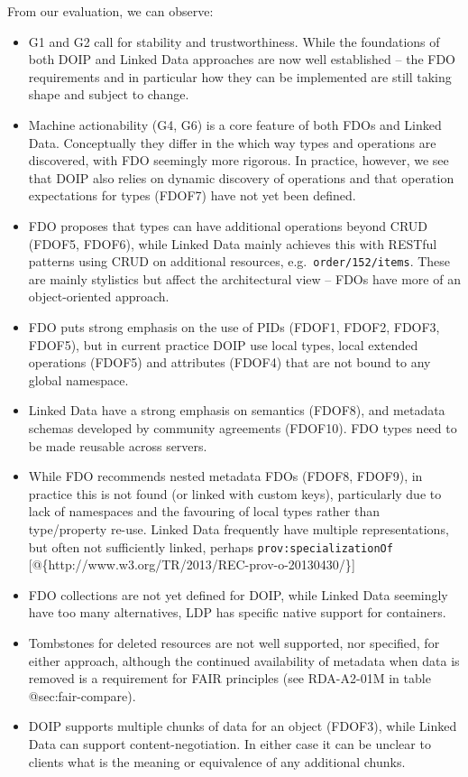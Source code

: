 From our evaluation, we can observe:

\begin{itemize}
\tightlist
\item
  G1 and G2 call for stability and trustworthiness. While the
  foundations of both DOIP and Linked Data approaches are now well
  established -- the FDO requirements and in particular how they can be
  implemented are still taking shape and subject to change.
\item
  Machine actionability (G4, G6) is a core feature of both FDOs and
  Linked Data. Conceptually they differ in the which way types and
  operations are discovered, with FDO seemingly more rigorous. In
  practice, however, we see that DOIP also relies on dynamic discovery
  of operations and that operation expectations for types (FDOF7) have
  not yet been defined.
\item
  FDO proposes that types can have additional operations beyond CRUD
  (FDOF5, FDOF6), while Linked Data mainly achieves this with RESTful
  patterns using CRUD on additional resources,
  e.g.~\texttt{order/152/items}. These are mainly stylistics but affect
  the architectural view -- FDOs have more of an object-oriented
  approach.
\item
  FDO puts strong emphasis on the use of PIDs (FDOF1, FDOF2, FDOF3,
  FDOF5), but in current practice DOIP use local types, local extended
  operations (FDOF5) and attributes (FDOF4) that are not bound to any
  global namespace.
\item
  Linked Data have a strong emphasis on semantics (FDOF8), and metadata
  schemas developed by community agreements (FDOF10). FDO types need to
  be made reusable across servers.
\item
  While FDO recommends nested metadata FDOs (FDOF8, FDOF9), in practice
  this is not found (or linked with custom keys), particularly due to
  lack of namespaces and the favouring of local types rather than
  type/property re-use. Linked Data frequently have multiple
  representations, but often not sufficiently linked, perhaps
  \texttt{prov:specializationOf}
  {[}@\{http://www.w3.org/TR/2013/REC-prov-o-20130430/\}{]}
\item
  FDO collections are not yet defined for DOIP, while Linked Data
  seemingly have too many alternatives, LDP has specific native support
  for containers.
\item
  Tombstones for deleted resources are not well supported, nor
  specified, for either approach, although the continued availability of
  metadata when data is removed is a requirement for FAIR principles
  (see RDA-A2-01M in table @sec:fair-compare).
\item
  DOIP supports multiple chunks of data for an object (FDOF3), while
  Linked Data can support content-negotiation. In either case it can be
  unclear to clients what is the meaning or equivalence of any
  additional chunks.
\end{itemize}

